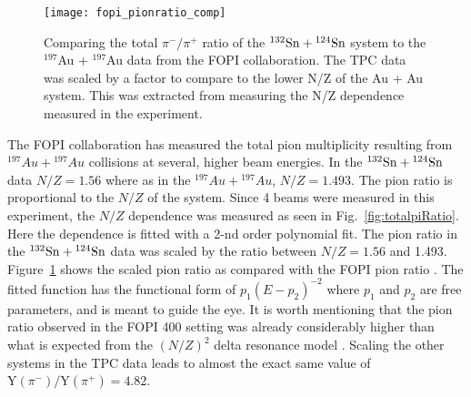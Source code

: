 \begin{figure}[!htb]
\centering
\texttt{[image: fopi\_pionratio\_comp]}
\caption{Comparing the total $\pi^-/\pi^+$ ratio of the ${}^{132}\mathrm{Sn} + {}^{124}\mathrm{Sn}$ system to the ${}^{197}$Au + ${}^{197}$Au data from the FOPI collaboration. The \spirit TPC data was scaled by a factor to compare to the lower N/Z of the Au + Au system. This was extracted from measuring the N/Z dependence measured in the experiment. }
\label{fig:fopiPionRatio}
\end{figure}

The FOPI collaboration has measured the total pion multiplicity resulting from ${}^{197}Au + {}^{197}Au$ collisions at several, higher beam energies. In the ${}^{132}\mathrm{Sn} + {}^{124}\mathrm{Sn}$ data  $N/Z=1.56$ where as in the ${}^{197}Au + {}^{197}Au$, $N/Z=1.493$. The pion ratio is proportional to the $N/Z$ of the system. Since 4 beams were measured in this experiment, the $N/Z$ dependence was measured as seen in Fig.~\ref{fig:totalpiRatio}. Here the dependence is fitted with a 2-nd order polynomial fit. The pion ratio in the ${}^{132}\mathrm{Sn} + {}^{124}\mathrm{Sn}$ data  was scaled by the ratio between $N/Z=1.56$ and 1.493. Figure~\ref{fig:fopiPionRatio} shows the scaled pion ratio as compared with the FOPI pion ratio \cite{fopi}. The fitted function has the functional form of $p_1(E - p_2)^{-2}$ where $p_1$ and $p_2$ are free parameters, and is meant to guide the eye. It is worth mentioning that the pion ratio observed in the FOPI \SI{400}{\MeVA} setting was already considerably higher than what is expected from the $(N/Z)^2$ delta resonance model \cite{baoan_piprod1,baoan_piprod2}. Scaling the other systems in the \spirit TPC data leads to almost the exact same value of $\mathrm{Y}(\pi^-)/\mathrm{Y}(\pi^+) = \num{4.82}$.






